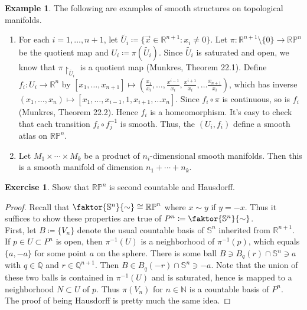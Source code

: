 \documentclass[10pt,letterpaper,cm]{nupset}
\theoremstyle{definition}
\newtheorem{exmp}{Example}
\newtheorem{exercise}{Exercise}
\newcommand{\N}{\mathbb N}
\newcommand{\Q}{\mathbb Q}
\newcommand{\R}{\mathbb R}
\newcommand{\RP}{\mathbb{RP}}
\renewcommand{\S}{\mathbb S}
\newcommand{\1}{\mathbf{1}}
\newcommand{\x}{\vec x}
\newcommand{\0}{\vec 0}
\begin{document}
\begin{exmp}{The following are examples of smooth structures on topological manifolds.}
\begin{enumerate}
\item For each $i = 1, \ldots, n+1$, let $\tilde{U_i}\coloneqq  \{\x \in \R^{n+1} : x_i \ne 0\}$. Let $\pi: \R^{n+1} \setminus\{0\} \to \RP^n$ be the quotient map and $U_i \coloneqq  \pi(\tilde{U_i})$. Since $\tilde{U_i}$ is saturated and open, we know that $\pi \restriction_{\tilde{U_i}}$ is a quotient map (Munkres, Theorem 22.1). Define $f_i : U_i \to \R^n$ by $[x_1, \ldots, x_{n+1}] \mapsto (\frac{x_1}{x_i}, \ldots, \frac{x^{i-1}}{x_i}, \frac{x^{i+1}}{x_i}, \ldots \frac{x_{n+1}}{x_i})$, which has inverse $(x_1, \ldots, x_n) \mapsto [x_1, \ldots, x_{i-1}, 1, x_{i+1}, \ldots x_n]$. Since $f_i \circ \pi$ is continuous, so is $f_i$ (Munkres, Theorem 22.2). Hence $f_i$ is a homeomorphism. It's easy to check that each transition $f_i \circ f_j^{-1}$ is smooth. Thus, the $(U_i, f_i)$ define a smooth atlas on $\RP^n$.
\item Let $M_1 \times \cdots \times M_k$ be a product of $n_i$-dimensional smooth manifolds. Then this is a smooth manifold of dimension $n_1 + \cdots + n_k$.
\end{enumerate}

\end{exmp}

\begin{exercise} Show that $\RP^n$ is second countable and Hausdorff. 
\end{exercise}

\begin{proof}
Recall that $\faktor{\S^n}{\sim} \cong \RP^n$ where $x \sim y$ if $y = -x$. Thus it suffices to show these properties are true of $P^n\coloneqq  \faktor{\S^n}{\sim}$. 
\\ First, let $B\coloneqq \{V_n\}$ denote the usual countable basis of $\S^n$ inherited from $\R^{n+1}$. If $p\in U\subset P^n$ is open, then $\pi^{-1}(U)$ is a neighborhood of $\pi^{-1}(p)$, which equals $\{a, -a\}$ for some point $a$ on the sphere.  There is some ball $B \ni B_q(r) \cap \S^n \ni a$ with $q\in \Q$ and $r \in \Q^{n+1}$. Then $B \in B_q(-r) \cap \S^n \ni -a$. Note that the union of these two balls is contained in $\pi^{-1}(U)$ and is saturated, hence is mapped to a neighborhood $N \subset U$ of $p$. Thus $\pi(V_n)$ for $n\in \N$ is a countable basis of $P^n$.
\\ The proof of being Hausdorff is pretty much the same idea.
\end{proof}
\end{document}
